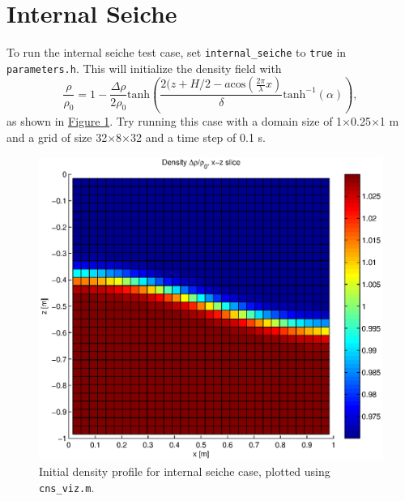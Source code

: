 \documentclass[12pt]{report}
\begin{document}
\section{Internal Seiche}
To run the internal seiche test case, set \texttt{internal\_seiche} to \texttt{true} in \texttt{parameters.h}. This will initialize the density field with
\begin{equation}
\frac{\rho}{\rho_0}=1-\frac{\Delta\rho}{2\rho_0}\text{tanh}\left(\frac{2(z+H/2-a\text{cos}(\frac{2\pi}{\lambda}x)}{\delta}\text{tanh}^{-1}(\alpha)\right),
\end{equation}
as shown in \hyperref[fig:seiche]{Figure \ref*{fig:seiche}}. Try running this case with a domain size of 1$\times$0.25$\times$1 m and a grid of size 32$\times$8$\times$32 and a time step of 0.1 s. 
\begin{figure}
\centering
\includegraphics[scale=0.6]{seiche}
\caption{Initial density profile for internal seiche case, plotted using \texttt{cns\_viz.m}.}
\label{fig:seiche}
\end{figure}
\end{document}
